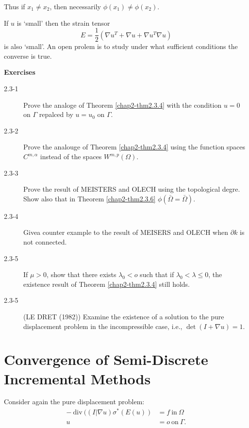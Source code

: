  Thus if $x_1 \neq x_2$, then necessarily $\phi (x_1) \neq \phi (x_2)$.

If $u$ is `small' then the strain tensor 
 $$
 E =\frac{1}{2}(\nabla u^T + \nabla u+ \nabla u^T
 \nabla u) 
 $$
 is also `small'. An open prolem is to study under what sufficient
 conditions the converse is true. 

\medskip 
 \begin{center}
 {\large\bf  Exercises}
 \end{center}
 
\begin{description}
\item[2.3-1] Prove the analoge of Theorem \ref{chap2-thm2.3.4} with
 the condition $u=0$ on $\Gamma$ repalced by $u= u_0$ on $\Gamma$. 

\item[2.3-2] Prove the analouge of Theorem \ref{chap2-thm2.3.4} using the
  function spaces $ C^{m,\alpha}$ instead of the spaces 
  $W^{m,p}(\Omega)$.
 
 \item[2.3-3] Prove the result of MEISTERS and OLECH using the
   topological degre. Show also that in Theorem \ref{chap2-thm2.3.6} $\phi
   (\bar{\Omega}= \bar{\Omega})$.  

\item[2.3-4] Give\pageoriginale a counter example to the result of
   MEISERS and OLECH when $\partial k$ is not connected. 
 
 \item[2.3-5] If $\mu>0$, show that there exists $\lambda_0 < o$ such
   that if $\lambda_0 < \lambda \leq 0$, the existence result of
   Theorem \ref{chap2-thm2.3.4} still holds.  

 \item[2.3-5] (LE DRET (1982)) Examine the existence of a solution
   to the pure displacement problem in the incompressible case,
   i.e., $\det (I+\nabla u)=1$.  
\end{description} 
 
\section[Convergence of Semi-Discrete...]{Convergence of Semi-Discrete Incremental\hfill\break
   Methods}\label{chap2-sec2.4} %
 
Consider again the pure displacement problem:
 \begin{align*}
   - ~\text{div}~ ( (I | \nabla u ) \sigma^* ( E(u)) &= f ~\text{in}~
   \Omega \tag{2.4-1}\label{eq2.4-1}\\ 
    u & = o ~\text{on}~ \Gamma . \tag{2.4-2}\label{eq2.4-2}
 \end{align*} 
 
